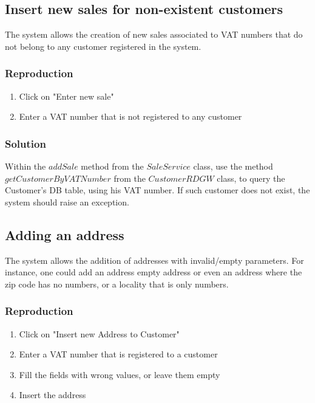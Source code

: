 \documentclass[12pt]{article}
\begin{document}
\subsection{Insert new sales for non-existent customers}
The system allows the creation of new sales associated to VAT numbers that do not belong to any customer registered in the system.

\subsubsection{Reproduction}
\begin{enumerate}
   \item  Click on "Enter new sale"
   
   \item  Enter a VAT number that is not registered to any customer
\end{enumerate}


\subsubsection{Solution}
Within the $addSale$ method from the $SaleService$ class, use the method $getCustomerByVATNumber$ from the $CustomerRDGW$ class, to query the Customer's DB table, using his VAT number. If such customer does not exist, the system should raise an exception.

\subsection{Adding an address}
The system allows the addition of addresses with invalid/empty parameters. For instance, one could add an address empty address or even an address where the zip code has no numbers, or a locality that is only numbers.

\subsubsection{Reproduction}
\begin{enumerate}
   \item  Click on "Insert new Address to Customer"
   
   \item  Enter a VAT number that is registered to a customer
   
   \item  Fill the fields with wrong values, or leave them empty
   
   \item  Insert the address
\end{enumerate}
\end{document}
